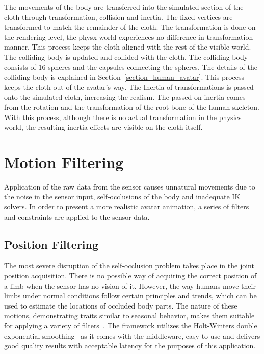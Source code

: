 The movements of the body are transferred into the simulated section of the cloth through transformation, collision and inertia. The fixed vertices are transformed to match the remainder of the cloth. The transformation is done on the rendering level, the physx world experiences no difference in transformation manner. This process keeps the cloth aligned with the rest of the visible world. The colliding body is updated and collided with the cloth. The colliding body consists of 16 spheres and the capsules connecting the spheres. The details of the colliding body is explained in Section~\ref{section_human_avatar}. This process keeps the cloth out of the avatar's way. The Inertia of transformations is passed onto the simulated cloth, increasing the realism. The passed on inertia comes from the rotation and the transformation of the root bone of the human skeleton. With this process, although there is no actual transformation in the physics world, the resulting inertia effects are visible on the cloth itself. 

\section{Motion Filtering}
\label{section_motion_filtering}

Application of the raw data from the sensor causes unnatural movements due to the noise in the sensor input, self-occlusions of the body and inadequate IK solvers. In order to present a more realistic avatar animation, a series of filters and constraints are applied to the sensor data. 

\subsection{Position Filtering}
The most severe disruption of the self-occlusion problem takes place in the joint position acquisition. There is no possible way of acquiring the correct position of a limb when the sensor has no vision of it. However, the way humans move their limbs under normal conditions follow certain principles and trends, which can be used to estimate the locations of occluded body parts. The nature of these motions, demonstrating traits similar to seasonal behavior, makes them suitable for applying a variety of filters~\cite{Azimi2012}. The framework utilizes the Holt-Winters double exponential smoothing~\cite{Holt2004,Kalekar2004}  as it comes with the middleware, easy to use and delivers good quality results with acceptable latency for the purposes of this application. 

